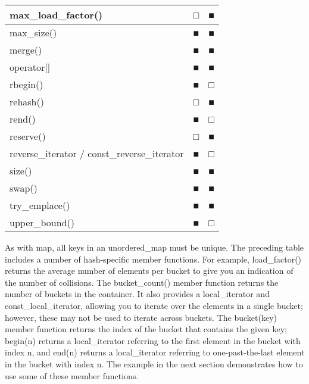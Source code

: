 \begin{longtable}{|l|l|l|}
max\_load\_factor()                          & □            & ■                       \\ \hline
max\_size()                                  & ■            & ■                       \\ \hline
merge()                                      & ■            & ■                       \\ \hline
operator{[}{]}                               & ■            & ■                       \\ \hline
rbegin()                                     & ■            & □                       \\ \hline
rehash()                                     & □            & ■                       \\ \hline
rend()                                       & ■            & □                       \\ \hline
reserve()                                    & □            & ■                       \\ \hline
reverse\_iterator / const\_reverse\_iterator & ■            & □                       \\ \hline
size()                                       & ■            & ■                       \\ \hline
swap()                                       & ■            & ■                       \\ \hline
try\_emplace()                               & ■            & ■                       \\ \hline
upper\_bound()                               & ■            & □                       \\ \hline
\end{longtable}

As with map, all keys in an unordered\_map must be unique. The preceding table includes a number of hash-specific member functions. For example, load\_factor() returns the average number of elements per bucket to give you an indication of the number of collisions. The bucket\_count() member function returns the number of buckets in the container. It also provides a local\_iterator and const\_local\_iterator, allowing you to iterate over the elements in a single bucket; however, these may not be used to iterate across buckets. The bucket(key) member function returns the index of the bucket that contains the given key; begin(n) returns a local\_iterator referring to the first element in the bucket with index n, and end(n) returns a local\_iterator referring to one-past-the-last element in the bucket with index n. The example in the next section demonstrates how to use some of these member functions.

